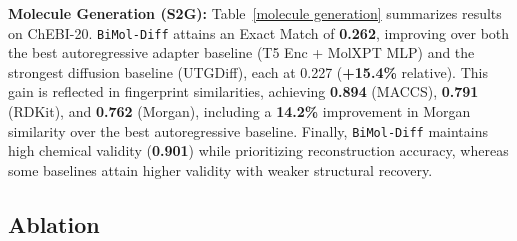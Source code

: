 \noindent \textbf{Molecule Generation (S2G):} Table~\ref{molecule generation} summarizes results on ChEBI-20. \texttt{BiMol-Diff} attains an Exact Match of \textbf{0.262}, improving over both the best autoregressive adapter baseline (T5 Enc + MolXPT MLP) and the strongest diffusion baseline (UTGDiff), each at 0.227 (\textbf{+15.4\%} relative). This gain is reflected in fingerprint similarities, achieving \textbf{0.894} (MACCS), \textbf{0.791} (RDKit), and \textbf{0.762} (Morgan), including a \textbf{14.2\%} improvement in Morgan similarity over the best autoregressive baseline. Finally, \texttt{BiMol-Diff} maintains high chemical validity (\textbf{0.901}) while prioritizing reconstruction accuracy, whereas some baselines attain higher validity with weaker structural recovery.
\subsection{Ablation}
